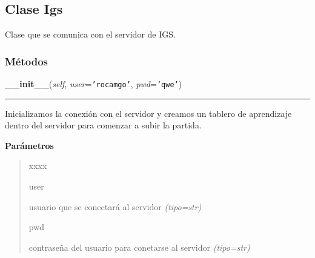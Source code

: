 
\subsection{Clase Igs}

    \label{src:igs:Igs}

Clase que se comunica con el servidor de IGS.


  \subsubsection{Métodos}

    \label{src:igs:Igs:__init__}

    \vspace{0.5ex}

\hspace{.8\funcindent}\begin{boxedminipage}{\funcwidth}

    \raggedright \textbf{\_\_init\_\_}(\textit{self}, \textit{user}={\tt \texttt{'}\texttt{rocamgo}\texttt{'}}, \textit{pwd}={\tt \texttt{'}\texttt{qwe}\texttt{'}})

    \vspace{-1.5ex}

    \rule{\textwidth}{0.5\fboxrule}
\setlength{\parskip}{2ex}
Inicializamos la conexión con el servidor y creamos un tablero de aprendizaje dentro del servidor para comenzar a subir la partida.

\setlength{\parskip}{1ex}
      \textbf{Parámetros}
      \vspace{-1ex}

      \begin{quote}
        \begin{Ventry}{xxxx}

          \item[user]


usuario que se conectará al servidor
            {\it (tipo=str)}

          \item[pwd]


contraseña del usuario para conetarse al servidor
            {\it (tipo=str)}

        \end{Ventry}

      \end{quote}

    \end{boxedminipage}

